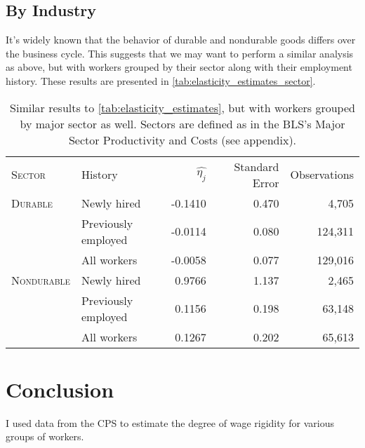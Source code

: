 \documentclass[11pt]{article}
\begin{document}
\subsection{By Industry}

It's widely known that the behavior of durable and nondurable goods differs over the business cycle.
This suggests that we may want to perform a similar analysis as above, but with workers grouped by their sector along with their employment history.
These results are presented in \autoref{tab:elasticity_estimates_sector}.

\begin{table}
    \centering
    \begin{tabular}{llrrr} \toprule
       \textsc{Sector}     & History              & $\hat{\eta_j}$ & Standard Error   & Observations\\
       \textsc{Durable}    & Newly hired          & -0.1410         & 0.470            & 4,705       \\
                  & Previously employed  & -0.0114         & 0.080            & 124,311     \\
                  & All workers          & -0.0058         & 0.077            & 129,016     \\
       \textsc{Nondurable} & Newly hired          & 0.9766          & 1.137            & 2,465       \\
                  & Previously employed  & 0.1156          & 0.198            & 63,148      \\
                  & All workers          & 0.1267          & 0.202            & 65,613      \\ \bottomrule
    \end{tabular}
    \caption{
                Similar results to \autoref{tab:elasticity_estimates}, but with workers grouped by major sector as well. Sectors are defined as in the BLS's Major Sector Productivity and Costs (see appendix).
            }
    \label{tab:elasticity_estimates_sector}
\end{table}


\section{Conclusion}

I used data from the CPS to estimate the degree of wage rigidity for various groups of workers.

\newpage


\end{document}
